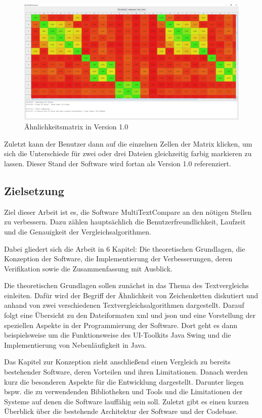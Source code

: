 \begin{figure}[!htb]
    \centering
    \includegraphics[scale=0.25]{images/matrix V1.png}
    \caption{Ähnlichkeitsmatrix in Version 1.0}
    \label{fig:matrix_v1}
\end{figure}

Zuletzt kann der Benutzer dann auf die einzelnen Zellen der Matrix klicken, um sich die Unterschiede für zwei oder drei Dateien gleichzeitig farbig markieren zu lassen. Dieser Stand der Software wird fortan als Version 1.0 referenziert.

\subsection{Zielsetzung}\label{zielsetzung}
Ziel dieser Arbeit ist es, die Software MultiTextCompare an den nötigen Stellen zu verbessern. Dazu zählen hauptsächlich die Benutzerfreundlichkeit, Laufzeit und die Genauigkeit der Vergleichsalgorithmen.

Dabei gliedert sich die Arbeit in 6 Kapitel: Die theoretischen Grundlagen, die Konzeption der Software, die Implementierung der Verbesserungen, deren Verifikation sowie die Zusammenfassung mit Ausblick.

Die theoretischen Grundlagen sollen zunächst in das Thema des Textvergleichs einleiten. Dafür wird der Begriff der Ähnlichkeit von Zeichenketten diskutiert und anhand von zwei verschiedenen Textvergleichsalgorithmen dargestellt. Darauf folgt eine Übersicht zu den Dateiformaten \acrshort{xml} und \acrshort{json} und eine Vorstellung der speziellen Aspekte in der Programmierung der Software. Dort geht es dann beispielsweise um die Funktionsweise des UI-Toolkits Java Swing und die Implementierung von Nebenläufigkeit in Java.

Das Kapitel zur Konzeption zieht anschließend einen Vergleich zu bereits bestehender Software, deren Vorteilen und ihren Limitationen. Danach werden kurz die besonderen Aspekte für die Entwicklung dargestellt. Darunter liegen bspw. die zu verwendenden Bibliotheken und Tools und die Limitationen der Systeme auf denen die Software lauffähig sein soll. Zuletzt gibt es einen kurzen Überblick über die bestehende Architektur der Software und der Codebase.

